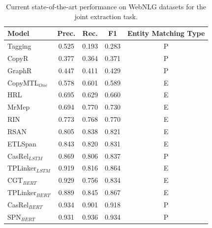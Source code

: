 \begin{table}[ht]
\small
\centering
\begin{tabular}{l|cccc}
\hline
Model   & Prec.     & Rec.      & F1     & Entity Matching Type     \\ \hline
Tagging  & 0.525     & 0.193     & 0.283   & P    \\
CopyR   & 0.377     & 0.364     & 0.371    & P  \\
GraphR   & 0.447 & 0.411 & 0.429  & P  \\
CopyMTL$_{One}$  & 0.578 & 0.601 & 0.589 & E \\
HRL    & 0.695   & 0.629    &  0.660   & E   \\
MrMep    & 0.694    & 0.770  &  0.730  & E    \\
RIN  & 0.773 & 0.768 & 0.770 & E \\
RSAN  & 0.805    & 0.838    & 0.821  & E \\
ETLSpan   & 0.843    & 0.820    & 0.831  & E \\
CasRel$_{LSTM}$         & 0.869    & 0.806   &  0.837  & P \\ 
TPLinker$_{LSTM} $ & 0.919 & 0.816 & 0.864 & E \\ \hline
CGT$_{BERT}$   & 0.929 & 0.756 & 0.834 & E \\
TPLinker$_{BERT} $ & 0.889 & 0.845 & 0.867 & E \\ 
CasRel$_{BERT}$         & 0.934    & 0.901   &  0.918  & P \\ 
SPN$_{BERT}$  & 0.931 & 0.936 & 0.934 & P  \\\hline
\end{tabular}
\caption{Current state-of-the-art performance on WebNLG datasets for the joint extraction task.}
\label{tab:webnlg_joint_sota}
\end{table}

